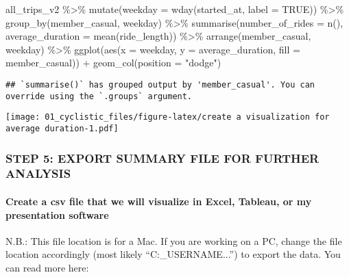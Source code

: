 \documentclass[
]{article}
\newenvironment{Shaded}{\begin{snugshade}}{\end{snugshade}}
\newcommand{\AttributeTok}[1]{\textcolor[rgb]{0.77,0.63,0.00}{#1}}
\newcommand{\ConstantTok}[1]{\textcolor[rgb]{0.00,0.00,0.00}{#1}}
\newcommand{\FunctionTok}[1]{\textcolor[rgb]{0.00,0.00,0.00}{#1}}
\newcommand{\NormalTok}[1]{#1}
\newcommand{\SpecialCharTok}[1]{\textcolor[rgb]{0.00,0.00,0.00}{#1}}
\newcommand{\StringTok}[1]{\textcolor[rgb]{0.31,0.60,0.02}{#1}}
\begin{document}
\begin{Shaded}
\begin{Highlighting}[]
\NormalTok{all\_trips\_v2 }\SpecialCharTok{\%\textgreater{}\%} 
  \FunctionTok{mutate}\NormalTok{(}\AttributeTok{weekday =} \FunctionTok{wday}\NormalTok{(started\_at, }\AttributeTok{label =} \ConstantTok{TRUE}\NormalTok{)) }\SpecialCharTok{\%\textgreater{}\%} 
  \FunctionTok{group\_by}\NormalTok{(member\_casual, weekday) }\SpecialCharTok{\%\textgreater{}\%} 
  \FunctionTok{summarise}\NormalTok{(}\AttributeTok{number\_of\_rides =} \FunctionTok{n}\NormalTok{(), }
            \AttributeTok{average\_duration =} \FunctionTok{mean}\NormalTok{(ride\_length)) }\SpecialCharTok{\%\textgreater{}\%}
  \FunctionTok{arrange}\NormalTok{(member\_casual, weekday) }\SpecialCharTok{\%\textgreater{}\%} 
  \FunctionTok{ggplot}\NormalTok{(}\FunctionTok{aes}\NormalTok{(}\AttributeTok{x =}\NormalTok{ weekday, }\AttributeTok{y =}\NormalTok{ average\_duration, }
             \AttributeTok{fill =}\NormalTok{ member\_casual)) }\SpecialCharTok{+}
  \FunctionTok{geom\_col}\NormalTok{(}\AttributeTok{position =} \StringTok{"dodge"}\NormalTok{)}
\end{Highlighting}
\end{Shaded}

\begin{verbatim}
## `summarise()` has grouped output by 'member_casual'. You can override using the `.groups` argument.
\end{verbatim}

\texttt{[image: 01\_cyclistic\_files/figure-latex/create a visualization for average duration-1.pdf]}

\hypertarget{step-5-export-summary-file-for-further-analysis}{%
\subsubsection{STEP 5: EXPORT SUMMARY FILE FOR FURTHER
ANALYSIS}\label{step-5-export-summary-file-for-further-analysis}}

\hypertarget{create-a-csv-file-that-we-will-visualize-in-excel-tableau-or-my-presentation-software}{%
\paragraph{Create a csv file that we will visualize in Excel, Tableau,
or my presentation
software}\label{create-a-csv-file-that-we-will-visualize-in-excel-tableau-or-my-presentation-software}}

N.B.: This file location is for a Mac. If you are working on a PC,
change the file location accordingly (most likely
``C:\Users\YOUR\_USERNAME\Desktop...'') to export the data. You can read
more here:
\end{document}
